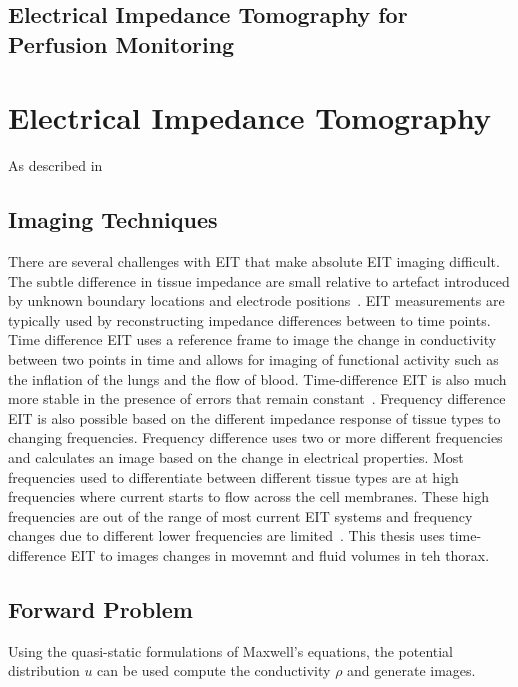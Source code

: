 \subsection{Electrical Impedance Tomography for Perfusion Monitoring}

\section{Electrical Impedance Tomography}
As described in  

\subsection{Imaging Techniques}
There are several challenges with EIT that make absolute EIT imaging difficult. 
The subtle difference in tissue impedance are small relative to artefact introduced 
by unknown boundary locations and electrode 
positions~\parencite{adler_why_2015,adler_electrical_2017,nissinen_compensation_2009}. 
EIT measurements are typically used by 
reconstructing impedance differences between to time points.
Time difference EIT uses a reference frame to image the change in conductivity between 
two points in time and allows for imaging of functional activity such as the inflation of the lungs 
and the flow of blood.
Time-difference EIT is also much more stable in the presence of errors that remain 
constant~\parencite{brown_electrical_2003,adler_electrical_2017}.
Frequency difference EIT is also possible based on the different impedance response 
of tissue types to changing frequencies. Frequency difference uses 
two or more different frequencies and calculates an image based on the change in electrical properties.
Most frequencies used to differentiate between different tissue types are at high frequencies 
where current starts to flow across the cell membranes. 
These high frequencies are out of the range of most current EIT systems and 
frequency changes due to different lower frequencies are limited~\parencite{adler_electrical_2017}.
This thesis uses time-difference EIT to images changes in movemnt and fluid volumes in teh thorax.

\subsection{Forward Problem}
Using the quasi-static 
formulations of Maxwell's equations, the potential distribution $u$ can be used 
compute the conductivity $\rho$ and generate images.

